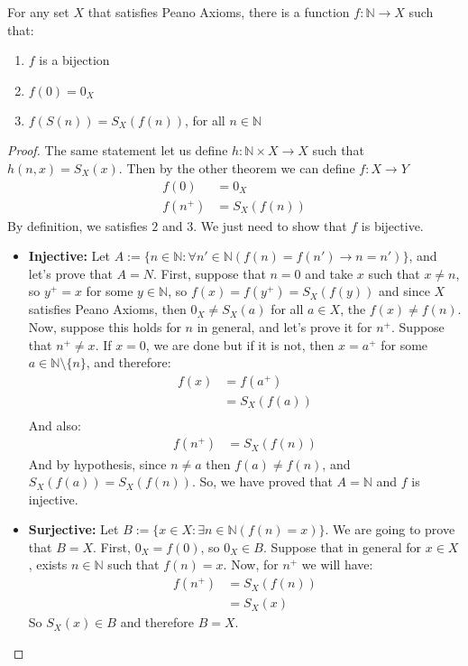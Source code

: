 \documentclass{tufte-handout}
\begin{document}
\begin{theorem}
	For any set $X$ that satisfies Peano Axioms, there is a function $f: \mathbb{N} \to X$ such that:
	\begin{enumerate}
		\item $f$ is a bijection
		\item $f(0) = 0_X$
		\item $f(S(n)) = S_X(f(n))$, for all $n \in \mathbb{N}$
	\end{enumerate}
\end{theorem}
\begin{proof}
	The same statement let us define $h: \mathbb{N} \times X \to X$ such that $h(n, x) = S_X(x)$. Then by the other theorem we can define $f: X \to Y$
	\begin{align*}
		f(0) &= 0_X\\
		f(n^+) &= S_X(f(n))
	\end{align*}
	By definition, we satisfies $2$ and $3$. We just need to show that $f$ is bijective.
	\begin{itemize}
		\item \textbf{Injective:} Let $A := \{n \in \mathbb{N}: \forall n' \in \mathbb{N}(f(n) = f(n') \rightarrow n=n')\}$, and let's prove that $A = N$. First, suppose that $n = 0$ and take $x$ such that $x \neq n$, so $y^+ = x$ for some $y \in \mathbb{N}$, so $f(x) = f(y^+) = S_X(f(y))$ and since $X$ satisfies Peano Axioms, then $0_X \neq S_X(a)$ for all $a \in X$, the $f(x) \neq f(n)$.\\ Now, suppose this holds for $n$ in general, and let's prove it for $n^+$. Suppose that $n^+ \neq x$. If $x = 0$, we are done but if it is not, then $x = a^+$ for some $a \in \mathbb{N} \setminus \{n\}$, and therefore:
		\begin{align*}
			f(x) &= f(a^+)\\
			&= S_X(f(a))\\
		\end{align*}
		And also:
		\begin{align*}
			f(n^+) &= S_X(f(n))
		\end{align*}
		And by hypothesis, since $n \neq a$ then $f(a) \neq f(n)$, and $S_X(f(a)) = S_X(f(n))$. So, we have proved that $A = \mathbb{N}$ and $f$ is injective.

		\item \textbf{Surjective:} Let $B := \{x \in X: \exists n \in \mathbb{N}(f(n) = x)\}$. We are going to prove that $B = X$. First, $0_X = f(0)$, so $0_X \in B$. Suppose that in general for $x \in X$, exists $n \in \mathbb{N}$ such that $f(n) = x$. Now, for $n^+$ we will have:
		\begin{align*}
			f(n^+) &= S_X(f(n))\\
			&= S_X(x)
		\end{align*}
		So $S_X(x) \in B$ and therefore $B = X$.
	\end{itemize}
\end{proof}
\end{document}
